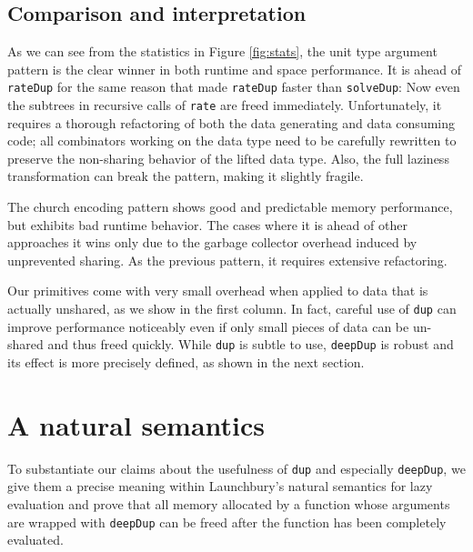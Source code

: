 \documentclass[preprint]{sigplanconf}
\theoremstyle{nonumberplain}
\newcommand{\li}{\lstinline[style=Haskell]}
\begin{document}
\subsection{Comparison and interpretation}

As we can see from the statistics in Figure \ref{fig:stats}, the unit type argument pattern is the clear winner in both runtime and space performance. It is ahead of \li-rateDup- for the same reason that made \li-rateDup- faster than \li-solveDup-: Now even the subtrees in recursive calls of \li-rate- are freed immediately.
Unfortunately, it requires a thorough refactoring of both the data generating and data consuming code; all combinators working on the data type need to be carefully rewritten to preserve the non-sharing behavior of the lifted data type. Also, the full laziness transformation can break the pattern, making it slightly fragile.

The church encoding pattern shows good and predictable memory performance, but exhibits bad runtime behavior. The cases where it is ahead of other approaches it wins only due to the garbage collector overhead induced by unprevented sharing. As the previous pattern, it requires extensive refactoring.

Our primitives come with very small overhead when applied to data that is actually unshared, as we show in the first column. In fact, careful use of \li-dup- can improve performance noticeably even if only small pieces of data can be un-shared and thus freed quickly. While \li-dup- is subtle to use, \li-deepDup- is robust and its effect is more precisely defined, as shown in the next section.

\pagebreak[3]
\section{A natural semantics}
\label{sec:semantics}

To substantiate our claims about the usefulness of \li-dup- and especially \li-deepDup-, we give them a precise meaning within Launchbury’s natural semantics for lazy evaluation \citep{launchbury} and prove that all memory allocated by a function whose arguments are wrapped with \li-deepDup- can be freed after the function has been completely evaluated.
\end{document}
